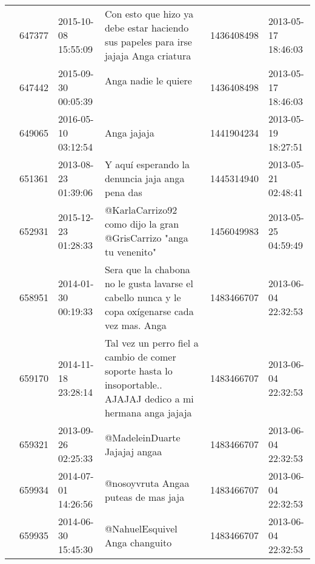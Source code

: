 \begin{tabular}{llllrl}
           & 647377  & 2015-10-08 15:55:09 &                                                          Con esto que hizo ya debe estar haciendo sus papeles para irse jajaja Anga criatura &  1436408498 & 2013-05-17 18:46:03 \\
           & 647442  & 2015-09-30 00:05:39 &                                                                                                                     Anga nadie le quiere 🙊🙊🙊 &  1436408498 & 2013-05-17 18:46:03 \\
           & 649065  & 2016-05-10 03:12:54 &                                                                                                                                  Anga jajaja &  1441904234 & 2013-05-19 18:27:51 \\
           & 651361  & 2013-08-23 01:39:06 &                                                                                              Y aquí esperando la denuncia jaja anga pena das &  1445314940 & 2013-05-21 02:48:41 \\
           & 652931  & 2015-12-23 01:28:33 &                                                                           @KarlaCarrizo92 como dijo la gran @GrisCarrizo  "anga tu venenito" &  1456049983 & 2013-05-25 04:59:49 \\
           & 658951  & 2014-01-30 00:19:33 &                                             Sera que la chabona no le gusta lavarse el cabello nunca y le copa oxígenarse cada vez mas. Anga &  1483466707 & 2013-06-04 22:32:53 \\
           & 659170  & 2014-11-18 23:28:14 &                               Tal vez un perro fiel a cambio de comer soporte hasta lo insoportable.. AJAJAJ dedico a mi hermana anga jajaja &  1483466707 & 2013-06-04 22:32:53 \\
           & 659321  & 2013-09-26 02:25:33 &                                                                                                                @MadeleinDuarte Jajajaj angaa &  1483466707 & 2013-06-04 22:32:53 \\
           & 659934  & 2014-07-01 14:26:56 &                                                                                                         @nosoyvruta Angaa puteas de mas jaja &  1483466707 & 2013-06-04 22:32:53 \\
           & 659935  & 2014-06-30 15:45:30 &                                                                                                               @NahuelEsquivel Anga changuito &  1483466707 & 2013-06-04 22:32:53 \\

\end{tabular}
